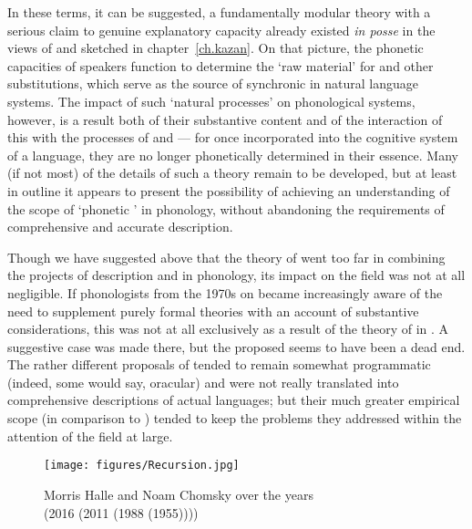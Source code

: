In these terms, it can be suggested, a fundamentally modular theory
with a serious claim to genuine explanatory capacity already existed
\textit{in posse} in the views of {\Baudouin} and {\Kruszewski} sketched in
chapter~\ref{ch.kazan}. On that picture, the phonetic capacities of
speakers function to determine the `raw material' for  and
other substitutions, which serve as the source of synchronic
 in natural language systems. The impact of such `natural
processes' on phonological systems, however, is a result both of their
substantive content and of the interaction of this with the processes
of  and  \citep{sra16:explanations} —
for once incorporated into the cognitive system of a language, they are no
longer phonetically determined in their essence. Many (if not most) of
the details of such a theory remain to be developed, but at least in
outline it appears to present the possibility of achieving an
understanding of the scope of `phonetic ' in phonology,
without abandoning the requirements of comprehensive and accurate
description.

Though we have suggested above that the theory of 
went too far in combining the projects of description and  in
phonology, its impact on the field was not at all negligible. If
phonologists from the 1970s on became increasingly aware of the need to
supplement purely formal theories with an account of substantive
considerations, this was not at all exclusively as a result of the
theory of  in \textsl{}. A suggestive case was made
there, but the  proposed seems to have been a dead end. The
rather different proposals of  tended to remain
somewhat programmatic (indeed, some would say, oracular) and were not
really translated into comprehensive descriptions of actual languages;
but their much greater empirical scope (in comparison to \textsl{})
tended to keep the problems they addressed within the attention of the
field at large.

\begin{figure}
  \texttt{[image: figures/Recursion.jpg]}
  \caption{Morris Halle and Noam Chomsky over the years\\
    (2016 (2011 (1988 (1955))))}
  \label{fig:ch.spe:hallechomsky}
\end{figure}



